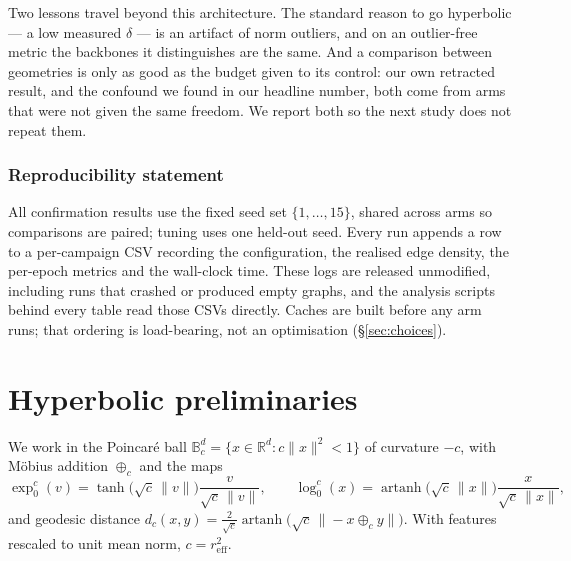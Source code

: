 \documentclass{article}
\begin{document}
Two lessons travel beyond this architecture. The standard reason to go
hyperbolic --- a low measured $\delta$ --- is an artifact of norm outliers, and
on an outlier-free metric the backbones it distinguishes are the same. And a
comparison between geometries is only as good as the budget given to its
control: our own retracted result, and the confound we found in our headline
number, both come from arms that were not given the same freedom. We report both
so the next study does not repeat them.

\subsubsection*{Reproducibility statement}

All confirmation results use the fixed seed set $\{1,\dots,15\}$, shared across
arms so comparisons are paired; tuning uses one held-out seed. Every run appends
a row to a per-campaign CSV recording the configuration, the realised edge
density, the per-epoch metrics and the wall-clock time. These logs are released
unmodified, including runs that crashed or produced empty graphs, and the
analysis scripts behind every table read those CSVs directly. Caches are built
before any arm runs; that ordering is load-bearing, not an optimisation
(\S\ref{sec:choices}).

\label{page:endprose}




\appendix
\label{page:startappendix}

\section{Hyperbolic preliminaries}
\label{app:math}

We work in the Poincar\'e ball
$\mathbb{B}^d_c = \{x \in \mathbb{R}^d : c\|x\|^2 < 1\}$ of curvature $-c$,
with M\"obius addition $\oplus_c$ and the maps
\begin{equation}
\exp^c_0(v) = \tanh\!\big(\sqrt{c}\,\|v\|\big)\frac{v}{\sqrt{c}\,\|v\|},
\qquad
\log^c_0(x) = \operatorname{artanh}\!\big(\sqrt{c}\,\|x\|\big)\frac{x}{\sqrt{c}\,\|x\|},
\end{equation}
and geodesic distance
$d_c(x,y) = \tfrac{2}{\sqrt{c}}\operatorname{artanh}\big(\sqrt{c}\,\|{-}x \oplus_c y\|\big)$.
With features rescaled to unit mean norm, $c = r_{\text{eff}}^2$.
\end{document}
